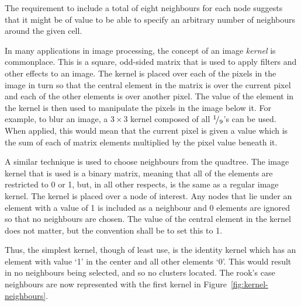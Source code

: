 The requirement to include a total of eight neighbours for each node suggests
that it might be of value to be able to specify an arbitrary number of
neighbours around the given cell.

In many applications in image processing, the concept of an image \emph{kernel}
is commonplace. This is a square, odd-sided matrix that is used to apply
filters and other effects to an image. The kernel is placed over each of the
pixels in the image in turn so that the central element in the matrix is over
the current pixel and each of the other elements is over another pixel. The
value of the element in the kernel is then used to manipulate the pixels in the
image below it. For example, to blur an image, a $3\times 3$ kernel composed of
all ${}^{1}\!/_{9}$'s can be used. When applied, this would mean that the
current pixel is given a value which is the sum of each of matrix elements
multiplied by the pixel value beneath it.

A similar technique is used to choose neighbours from the quadtree. The image
kernel that is used is a binary matrix, meaning that all of the elements are
restricted to 0 or 1, but, in all other respects, is the same as a regular
image kernel. The kernel is placed over a node of interest. Any nodes that lie
under an element with a value of 1 is included as a neighbour and 0 elements
are ignored so that no neighbours are chosen. The value of the central element
in the kernel does not matter, but the convention shall be to set this to 1.

Thus, the simplest kernel, though of least use, is the identity kernel which has
an element with value `1' in the center and all other elements `0'. This would
result in no neighbours being selected, and so no clusters located. The rook's
case neighbours are now represented with the first kernel in
Figure~\ref{fig:kernel-neighbours}.

